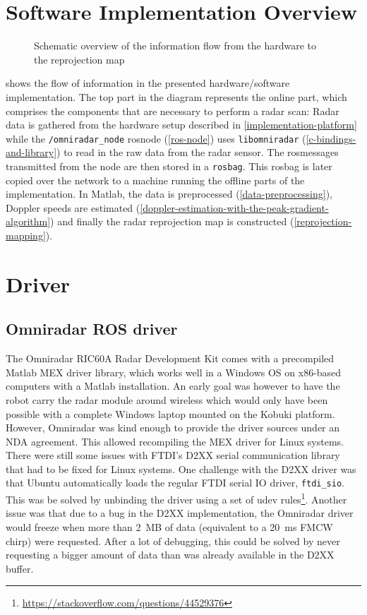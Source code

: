 \clearpage
\section{Software Implementation Overview}\label{overview}

\begin{figure}[htbp]
    \centering
    \def\svgwidth{\textwidth} \small
    
    \caption{Schematic overview of the information flow from the hardware to the reprojection map}
    \label{fig:overview}
\end{figure}

 shows the flow of information in the presented hardware/software implementation. The top part in the diagram represents the online part, which comprises the components that are necessary to perform a radar scan: Radar data is gathered from the hardware setup described in \cref{implementation-platform} while the \texttt{/omniradar\_node} rosnode (\cref{ros-node}) uses \texttt{libomniradar} (\cref{c-bindings-and-library}) to read in the raw data from the radar sensor. The rosmessages transmitted from the node are then stored in a \texttt{rosbag}. This rosbag is later copied over the network to a machine running the offline parts of the implementation. In Matlab, the data is preprocessed (\cref{data-preprocessing}), Doppler speeds are estimated (\cref{doppler-estimation-with-the-peak-gradient-algorithm}) and finally the radar reprojection map is constructed (\cref{reprojection-mapping}).

\section{Driver}\label{driver}

\subsection{Omniradar ROS driver}\label{omniradar-ros-driver}

The Omniradar RIC60A Radar Development Kit comes with a precompiled Matlab MEX driver library, which works well in a Windows OS on x86-based computers with a Matlab installation. An early goal was however to have the robot carry the radar module around wireless which would only have been possible with a complete Windows laptop mounted on the Kobuki platform. However, Omniradar was kind enough to provide the driver sources under an NDA agreement. This allowed recompiling
the MEX driver for Linux systems. There were still some issues with FTDI's
D2XX serial communication library that had to be fixed for Linux
systems. One challenge with the D2XX driver was that Ubuntu
automatically loads the regular FTDI serial IO driver,
\texttt{ftdi\_sio}. This was be solved by unbinding the driver using a
set of udev rules\footnote{\url{https://stackoverflow.com/questions/44529376}}. Another issue was that due to a bug in the D2XX implementation, the Omniradar
driver would freeze when more than \SI{2}{MB} of data (equivalent to a \SI{20}{ms}
FMCW chirp) were requested. After a lot of debugging, this could be
solved by never requesting a bigger amount of data than was already
available in the D2XX buffer.


